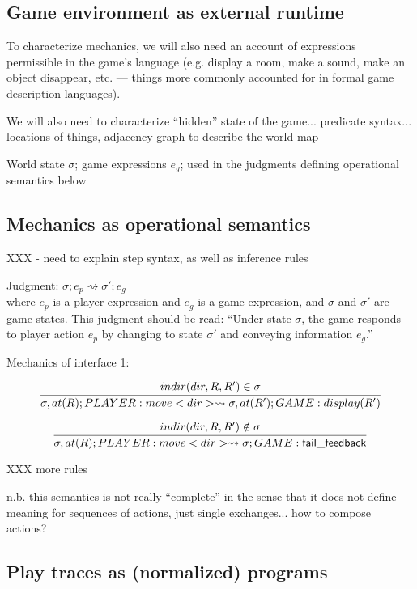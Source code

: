   \subsection{Game environment as external runtime}

  To characterize mechanics, we will also need an account of expressions
  permissible in the game's language (e.g. display a room, make a sound,
  make an object disappear, etc. --- things more commonly accounted for in
  formal game description languages). 

  We will also need to characterize ``hidden'' state of the game...
  predicate syntax... locations of things, adjacency graph to describe the
  world map

  World state $\sigma$; game expressions $e_g$; used in the judgments
  defining operational semantics below


  \subsection{Mechanics as operational semantics}

  XXX - need to explain step syntax, as well as inference rules

  
  
  \newcommand{\stepsto}{\rightsquigarrow}

  Judgment: $\sigma; e_p \stepsto \sigma'; e_g$ \\
  where $e_p$ is a player expression and $e_g$ is a game expression, and
  $\sigma$ and $\sigma'$ are game states. This judgment should be read:
  ``Under state $\sigma$, the game responds to player action $e_p$ by
  changing to state $\sigma'$ and conveying information $e_g$.''

  Mechanics of interface 1:

  \[
    \infer{
      \sigma, at(R); PLAYER: move<dir> \stepsto \sigma, at(R'); GAME:
      display(R')
    }
    {
      indir(dir, R, R') \in \sigma
    }
  \]


  \[
    \infer{
      \sigma, at(R); PLAYER: move<dir> \stepsto 
      \sigma; GAME: \mathsf{fail\_feedback}
    }
    {
      indir(dir, R, R') \notin \sigma
    }
  \]

  XXX more rules

  n.b. this semantics is not really ``complete'' in the sense that it does
  not define meaning for sequences of actions, just single exchanges... how
  to compose actions?

  \subsection{Play traces as (normalized) programs}
  

